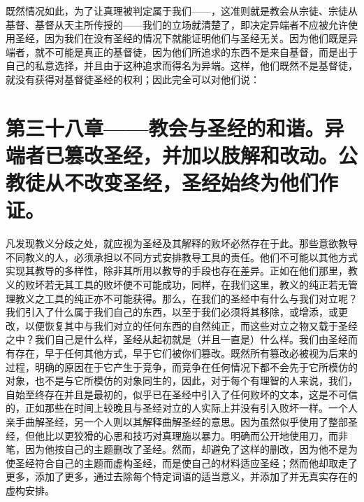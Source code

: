 既然情况如此，为了让真理被判定属于我们——，这准则就是教会从宗徒、宗徒从基督、基督从天主所传授的——我们的立场就清楚了，即决定异端者不应被允许使用圣经，因为我们在没有圣经的情况下就能证明他们与圣经无关。因为他们既是异端者，就不可能是真正的基督徒，因为他们所追求的东西不是来自基督，而是出于自己的私意选择，并且由于这种追求而得名为异端。这样，他们既然不是基督徒，就没有获得对基督徒圣经的权利；因此完全可以对他们说：\par


\section{第三十八章——教会与圣经的和谐。异端者已篡改圣经，并加以肢解和改动。公教徒从不改变圣经，圣经始终为他们作证。}

凡发现教义分歧之处，就应视为圣经及其解释的败坏必然存在于此。那些意欲教导不同教义的人，必须承担以不同方式安排教导工具的责任。他们不可能以其他方式实现其教导的多样性，除非其所用以教导的手段也存在差异。正如在他们那里，教义的败坏若无其工具的败坏便不可能成功，同样，在我们这里，教义的纯正若无管理教义之工具的纯正亦不可能获得。那么，在我们的圣经中有什么与我们对立呢？我们引入了什么属于我们自己的东西，以至于我们必须将其移除，或增添，或更改，以便恢复其中与我们对立的任何东西的自然纯正，而这些对立之物又载于圣经之中？我们自己是什么样，圣经从起初就是（并且一直是）什么样。我们由圣经而有存在，早于任何其他方式，早于它们被你们篡改。既然所有篡改必被视为后来的过程，明确的原因在于它产生于竞争，而竞争在任何情况下都不会先于它所模仿的对象，也不是与它所模仿的对象同生的，因此，对于每个有理智的人来说，我们，自始至终存在并且是最初的，似乎已在圣经中引入了任何败坏的文本，这是不可信的，正如那些在时间上较晚且与圣经对立的人实际上并没有引入败坏一样。一个人亲手曲解圣经，另一个人则以其解释曲解圣经的意思。因为虽然似乎使用了整部圣经，但他比以更狡猾的心思和技巧对真理施以暴力。明确而公开地使用刀，而非笔，因为他按自己的主题删改了圣经。然而，却避免了这样的删改，因为他不是为使圣经符合自己的主题而虚构圣经，而是使自己的材料适应圣经；然而他却取走了更多，添加了更多，通过去除每个特定词语的适当意义，并添加了并无真实存在的虚构安排。\par

